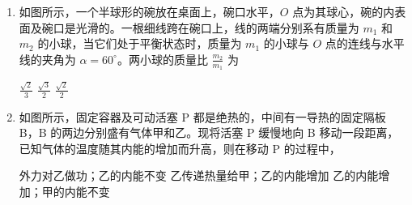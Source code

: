 \documentclass[\gkver]{gaokaozhenti}
\begin{document}
\begin{enumerate}
{振幅越大，则波传播的速度越慢}
{在一个周期内，振动质元走过的路程等于一个波长}
{振动的频率越高，则波传播一个波长的距离所用的时间越短}


\item
如图所示，一个半球形的碗放在桌面上，碗口水平，$O$ 点为其球心，碗的内表面及碗口是光滑的。一根细线跨在碗口上，线的两端分别系有质量为 $m_{1}$ 和 $m_{2}$ 的小球，当它们处于平衡状态时，质量为 $m_{1}$ 的小球与 $O$ 点的连线与水平线的夹角为 $\alpha=60^{\circ}$。两小球的质量比 $\frac{m_{2}}{m_{1}}$ 为


{$\frac{\sqrt{2}}{3}$}
{$\frac{\sqrt{3}}{2}$}
{$\frac{\sqrt{2}}{2}$}


\item
如图所示，固定容器及可动活塞 P 都是绝热的，中间有一导热的固定隔板 B，B 的两边分别盛有气体甲和乙。现将活塞 P 缓慢地向 B 移动一段距离，已知气体的温度随其内能的增加而升高，则在移动 P 的过程中，


{外力对乙做功；乙的内能不变}
{乙传递热量给甲；乙的内能增加}
{乙的内能增加；甲的内能不变}


\end{enumerate}
\end{document}
